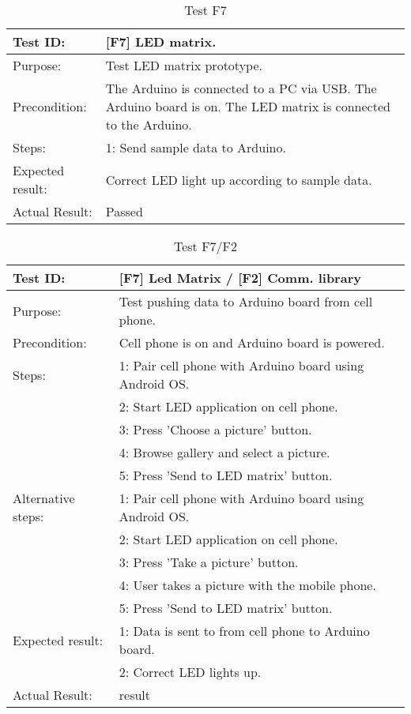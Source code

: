 \begin{table}[h!]
\begin{tabular}{|l|p{10cm}|}
\hline Test ID: &		[F7] LED matrix. \\
\hline Purpose: &		Test LED matrix prototype. \\
\hline Precondition: &	The Arduino is connected to a PC via USB. The Arduino
						board is on. The LED matrix is connected to the
						Arduino. \\
\hline
Steps:
 & 1: Send sample data to Arduino. \\
\hline
Expected result:
 & Correct LED light up according to sample data.\\ 
\hline
Actual Result:
 & Passed \\
\hline
\end{tabular}
\caption{Test F7}
\label{tbl:f7test}
\end{table}

\begin{table}[h!]
\begin{tabular}{|l|p{10cm}|}
\hline Test ID: &		[F7] Led Matrix / [F2] Comm. library \\
\hline Purpose: &		Test pushing data to Arduino board from cell phone. \\
\hline Precondition: &	Cell phone is on and Arduino board is powered. \\
\hline
Steps:
 & 1: Pair cell phone with Arduino board using Android OS.\\ 
 & 2: Start LED application on cell phone. \\ 
 & 3: Press 'Choose a picture' button. \\
 & 4: Browse gallery and select a picture. \\
 & 5: Press 'Send to LED matrix' button. \\
\hline
Alternative steps:
 & 1: Pair cell phone with Arduino board using Android OS.\\
 & 2: Start LED application on cell phone. \\ 
 & 3: Press 'Take a picture' button. \\
 & 4: User takes a picture with the mobile phone. \\
 & 5: Press 'Send to LED matrix' button. \\
\hline
Expected result:
 & 1: Data is sent to from cell phone to Arduino board.\\ 
 & 2: Correct LED lights up. \\ 
\hline
Actual Result: &  result \\
\hline
\end{tabular}
\caption{Test F7/F2}
\label{tbl:f7f2test}
\end{table}

